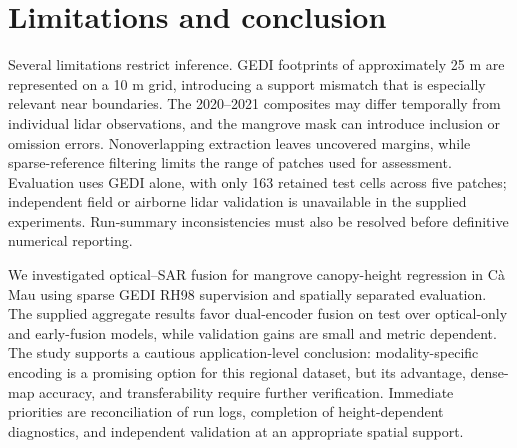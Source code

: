 \section{Limitations and conclusion}

Several limitations restrict inference. GEDI footprints of approximately 25 m are represented on a 10 m grid, introducing a support mismatch that is especially relevant near boundaries. The 2020--2021 composites may differ temporally from individual lidar observations, and the mangrove mask can introduce inclusion or omission errors. Nonoverlapping extraction leaves uncovered margins, while sparse-reference filtering limits the range of patches used for assessment. Evaluation uses GEDI alone, with only 163 retained test cells across five patches; independent field or airborne lidar validation is unavailable in the supplied experiments. Run-summary inconsistencies must also be resolved before definitive numerical reporting.

We investigated optical--SAR fusion for mangrove canopy-height regression in Cà Mau using sparse GEDI RH98 supervision and spatially separated evaluation. The supplied aggregate results favor dual-encoder fusion on test over optical-only and early-fusion models, while validation gains are small and metric dependent. The study supports a cautious application-level conclusion: modality-specific encoding is a promising option for this regional dataset, but its advantage, dense-map accuracy, and transferability require further verification. Immediate priorities are reconciliation of run logs, completion of height-dependent diagnostics, and independent validation at an appropriate spatial support.
